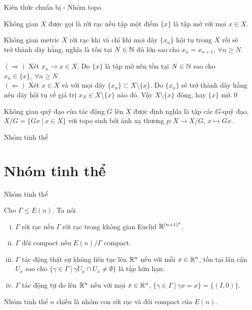 \begin{frame}{Kiến thức chuẩn bị - Nhóm topo}
    \begin{define}
        Không gian $X$ được gọi là rời rạc nếu tập một điểm $\{x\}$ là tập mở với mọi $x \in X$.
    \end{define}

    \begin{lemma1}
        Không gian metric $X$ rời rạc khi và chỉ khi mọi dãy $\{x_n\}$ hội tụ trong $X$ rồi sẽ trở thành dãy hằng, nghĩa là tồn tại $N \in \mathbb N$ đủ lớn sao cho $x_n = x_{n+1},\ \forall n \geq N$.
    \end{lemma1}
    \startproof $(\Rightarrow)$ Xét $x_n \rightarrow x \in X$. Do $\{x\}$ là tập mở nên tồn tại $N \in \mathbb N$ sao cho $x_n \in \{x\},\ \forall n \geq N$.\\
    $(\Leftarrow)$ Xét $x \in X$ và với mọi dãy $\{x_n\} \subset X\setminus\{x\}$. Do $\{x_n\}$ sẽ trở thành dãy hằng nên dãy hội tụ về giá trị $x_N \in X\setminus \{x\}$ nào đó. Vậy $X\setminus \{x\}$ đóng, hay $\{x\}$ mở.\qed
    \begin{define}
        Không gian quỹ đạo của tác động $G$ lên $X$ được định nghĩa là tập các $G$-quỹ đạo, $X/G = \{Gx\ |\ x \in X\}$ với topo sinh bởi ánh xạ thương $p: X \rightarrow X/G$, $x \mapsto Gx$.
    \end{define}
\end{frame}

\begin{frame}{Nhóm tinh thể}
    \section{Nhóm tinh thể}
\end{frame}

\begin{frame}{Nhóm tinh thể}
    \begin{define}
        Cho $\Gamma \leq E(n)$. Ta nói
        \begin{enumerate}[(i)]
            \item $\Gamma$ rời rạc nếu $\Gamma$ rời rạc trong không gian Euclid $\mathbb R^{(n+1)^2}$.
            \item $\Gamma$ đối compact nếu $E(n)/\Gamma$ compact.
            \item $\Gamma$ tác động thật sự không liên tục lên $\mathbb R^n$ nếu với mỗi $x \in \mathbb R^n$, tồn tại lân cận $U_x$ sao cho $\{ \gamma \in \Gamma\ |\ \gamma U_x \cap U_x \neq \emptyset \}$ là tập hữu hạn.
            \item $\Gamma$ tác động tự do lên $\mathbb R^n$ nếu với mọi $x \in \mathbb R^n$, $\{ \gamma \in \Gamma\ |\ \gamma x = x\} = \{(I,0)\}$.
        \end{enumerate}
    \end{define}

    \begin{define}
        Nhóm tinh thể $n$ chiều là nhóm con rời rạc và đối compact của $E(n)$.
    \end{define}
\end{frame}

